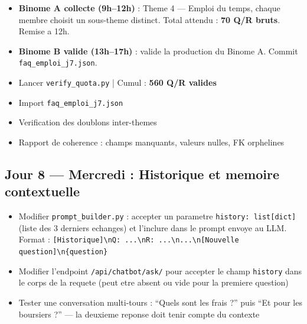 \documentclass[11pt,a4paper]{article}
\begin{document}
\begin{databox}[Data --- J7]
\begin{itemize}
    \item[$\square$] \textbf{Binome A collecte (9h--12h)} : Theme 4 --- Emploi du temps, chaque membre choisit un sous-theme distinct. Total attendu : \textbf{70 Q/R bruts}. Remise a 12h.
    \item[$\square$] \textbf{Binome B valide (13h--17h)} : valide la production du Binome A. Commit \texttt{faq\_emploi\_j7.json}.
    \item[$\square$] Lancer \texttt{verify\_quota.py} | Cumul : \textbf{560 Q/R valides}
\end{itemize}
\end{databox}

\begin{dbbox}
\begin{itemize}
    \item[$\square$] Import \texttt{faq\_emploi\_j7.json}
    \item[$\square$] Verification des doublons inter-themes
    \item[$\square$] Rapport de coherence : champs manquants, valeurs nulles, FK orphelines
\end{itemize}
\end{dbbox}

\subsection{Jour 8 --- Mercredi : Historique et memoire contextuelle}

\begin{ragbox}[Backend --- J8]
\begin{itemize}
    \item[$\square$] Modifier \texttt{prompt\_builder.py} : accepter un parametre \texttt{history: list[dict]} (liste des 3 derniers echanges) et l'inclure dans le prompt envoye au LLM. Format : \texttt{[Historique]\textbackslash nQ: ...\textbackslash nR: ...\textbackslash n...\textbackslash n[Nouvelle question]\textbackslash n\{question\}}
    \item[$\square$] Modifier l'endpoint \texttt{/api/chatbot/ask/} pour accepter le champ \texttt{history} dans le corps de la requete (peut etre absent ou vide pour la premiere question)
    \item[$\square$] Tester une conversation multi-tours : ``Quels sont les frais ?'' puis ``Et pour les boursiers ?'' --- la deuxieme reponse doit tenir compte du contexte
\end{itemize}
\end{ragbox}
\end{document}
